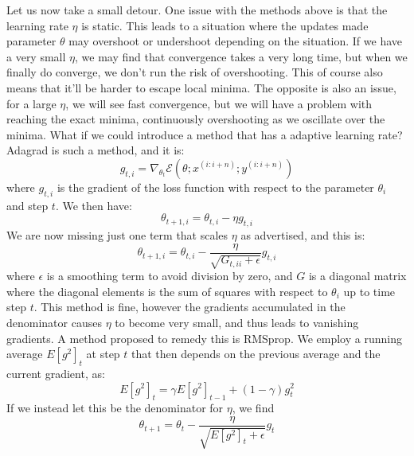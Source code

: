 \documentclass[12pt]{article}
\begin{document}
{Let us now take a small detour. One issue with the methods above is that the learning rate $\eta$ is static. This leads to a situation where the updates made parameter $\theta$ may overshoot or undershoot depending on the situation. If we have a very small $\eta$, we may find that convergence takes a very long time, but when we finally do converge, we don't run the risk of overshooting. This of course also means that it'll be harder to escape local minima. The opposite is also an issue, for a large $\eta$, we will see fast convergence, but we will have a problem with reaching the exact minima, continuously overshooting as we oscillate over the minima. \newline
What if we could introduce a method that has a adaptive learning rate? Adagrad is such a method, and it is:
\begin{equation*}
    g_{t,i} = \nabla_{\theta_t} \mathcal{E}(\theta; x^{(i:i+n)}; y^{(i:i+n)})
\end{equation*}
where $g_{t,i}$ is the gradient of the loss function with respect to the parameter $\theta_i$ and step $t$. We then have:
\begin{equation*}
    \theta_{t+1, i} = \theta_{t,i} - \eta g_{t,i}
\end{equation*}
We are now missing just one term that scales $\eta$ as advertised, and this is:
\begin{equation*}
    \theta_{t+1, i} = \theta_{t,i} - \frac{\eta}{\sqrt{G_{t, ii} + \epsilon}} g_{t,i}
\end{equation*}
where $\epsilon$ is a smoothing term to avoid division by zero, and $G$ is a diagonal matrix where the diagonal elements is the sum of squares with respect to $\theta_i$ up to time step $t$. \newline
This method is fine, however the gradients accumulated in the denominator causes $\eta$ to become very small, and thus leads to vanishing gradients.
\newline A method proposed to remedy this is RMSprop. We employ a running average $E[g^2]_t$ at step $t$ that then depends on the previous average and the current gradient, as:
\begin{equation*}
    E[g^2]_t = \gamma E[g^2]_{t-1} + (1 - \gamma)g^2_t
\end{equation*}
If we instead let this be the denominator for $\eta$, we find
\begin{equation*}
    \theta_{t+1} = \theta_t - \frac{\eta}{\sqrt{E[g^2]_t + \epsilon}} g_t
\end{equation*}
}
\end{document}
